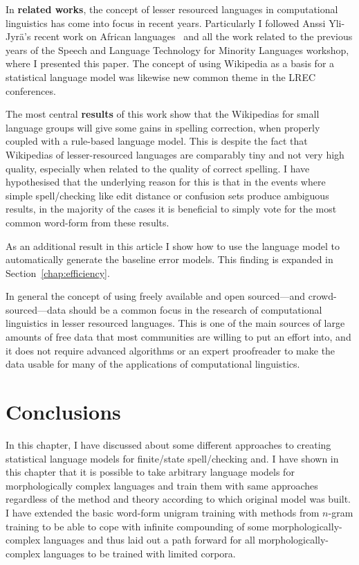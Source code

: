 \documentclass[officiallayout]{unihelcompling}
\begin{document}
In \textbf{related works}, the concept of lesser resourced languages in
computational linguistics has come into focus in recent years. Particularly I
followed Anssi Yli-Jyrä's recent work on African
languages~\citep{yli2005toward} and all the work related to the previous years
of the Speech and Language Technology for Minority Languages workshop, where I
presented this paper.  The concept of using Wikipedia as a basis for a
statistical language model was likewise new common theme in the LREC
conferences.

The most central \textbf{results} of this work show that the Wikipedias for
small language groups will give some gains in spelling correction, when
properly coupled with a rule-based language model. This is despite the fact
that Wikipedias of lesser-resourced languages are comparably tiny and not very
high quality, especially when related to the quality of correct spelling.  I
have hypothesised that the underlying reason for this is that in the events
where simple spell\-/checking like edit distance or confusion sets produce
ambiguous results, in the majority of the cases it is beneficial to simply vote
for the most common word-form from these results.

As an additional result in this article I show how to use the language model to
automatically generate the baseline error models. This finding is expanded in
Section~\ref{chap:efficiency}.

In general the concept of using freely available and open sourced---and
crowd-sourced---data should be a common focus in the research of computational
linguistics in lesser resourced languages. This is one of the main sources of
large amounts of free data that most communities are willing to put an effort
into, and it does not require advanced algorithms or an expert proofreader to
make the data usable for many of the applications of computational linguistics.

\section{Conclusions}

In this chapter, I have discussed about some different approaches to creating
statistical language models for finite\-/state spell\-/checking and. I have
shown in this chapter that it is possible to take arbitrary language models for
morphologically complex languages and train them with same approaches
regardless of the method and theory according to which original model was
built. I have extended the basic word-form unigram training with methods from
\(n\)-gram training to be able to cope with infinite compounding of some
morphologically-complex languages and thus laid out a path forward for all
morphologically-complex languages to be trained with limited corpora.
\end{document}
